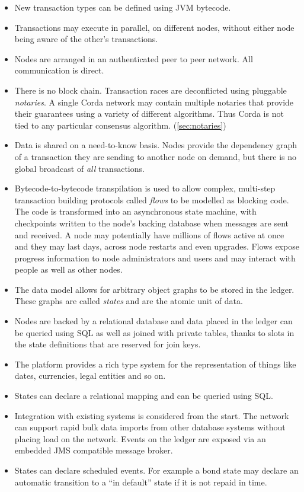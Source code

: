 \documentclass{article}
\begin{document}
\begin{itemize}
\item New transaction types can be defined using JVM\cite{JVM} bytecode.
\item Transactions may execute in parallel, on different nodes, without either node being aware of the other's transactions.
\item Nodes are arranged in an authenticated peer to peer network. All communication is direct.
\item There is no block chain\cite{Bitcoin}. Transaction races are deconflicted using pluggable \emph{notaries}. A single
Corda network may contain multiple notaries that provide their guarantees using a variety of different algorithms. Thus
Corda is not tied to any particular consensus algorithm. (\cref{sec:notaries})
\item Data is shared on a need-to-know basis. Nodes provide the dependency graph of a transaction they are sending to
another node on demand, but there is no global broadcast of \emph{all} transactions.
\item Bytecode-to-bytecode transpilation is used to allow complex, multi-step transaction building protocols called
\emph{flows} to be modelled as blocking code. The code is transformed into an asynchronous state machine, with
checkpoints written to the node's backing database when messages are sent and received. A node may potentially have
millions of flows active at once and they may last days, across node restarts and even upgrades. Flows expose progress
information to node administrators and users and may interact with people as well as other nodes.
\item The data model allows for arbitrary object graphs to be stored in the ledger. These graphs are called \emph{states} and are the atomic unit of data.
\item Nodes are backed by a relational database and data placed in the ledger can be queried using SQL as well as joined
with private tables, thanks to slots in the state definitions that are reserved for join keys.
\item The platform provides a rich type system for the representation of things like dates, currencies, legal entities and so on.
\item States can declare a relational mapping and can be queried using SQL.
\item Integration with existing systems is considered from the start. The network can support rapid bulk data imports
from other database systems without placing load on the network. Events on the ledger are exposed via an embedded JMS
compatible message broker.
\item States can declare scheduled events. For example a bond state may declare an automatic transition to a ``in default'' state if it is not repaid in time.
\end{itemize}
\end{document}
